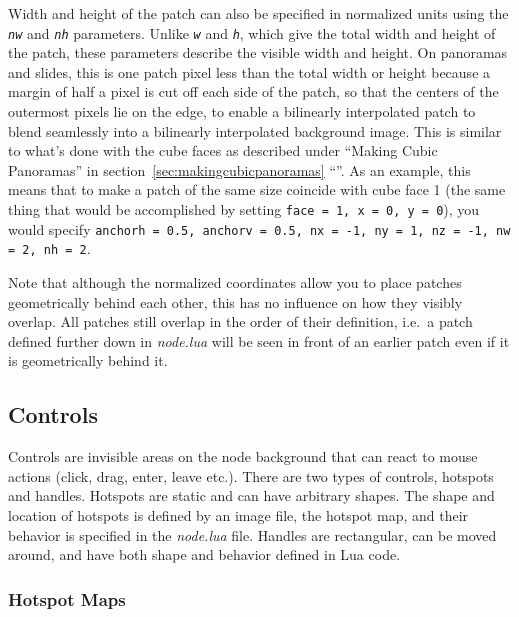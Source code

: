 \documentclass[
	a4paper,
	pagesize,
	10pt,
	oneside,
	idxtotoc,
	bibtotoc,
	BCOR10mm,
	DIV10
]{scrartcl} %
\newcommand{\luaparam}[1]{\texttt{\textit{#1}}}
\newcommand{\secref}[1]{\ref{sec:#1} “\nameref{sec:#1}”}
\begin{document}
Width and height of the patch can also be specified in normalized units using the \luaparam{nw} and \luaparam{nh} parameters. Unlike \luaparam{w} and \luaparam{h}, which give the total width and height of the patch, these parameters describe the visible width and height. On panoramas and slides, this is one patch pixel less than the total width or height because a margin of half a pixel is cut off each side of the patch, so that the centers of the outermost pixels lie on the edge, to enable a bilinearly interpolated patch to blend seamlessly into a bilinearly interpolated background image. This is similar to what's done with the cube faces as described under “Making Cubic Panoramas” in section~\secref{makingcubicpanoramas}. As an example, this means that to make a patch of the same size coincide with cube face 1 (the same thing that would be accomplished by setting \texttt{face = 1, x = 0, y = 0}), you would specify \texttt{anchorh = 0.5, anchorv = 0.5, nx = -1, ny = 1, nz = -1, nw = 2, nh = 2}.

Note that although the normalized coordinates allow you to place patches geometrically behind each other, this has no influence on how they visibly overlap. All patches still overlap in the order of their definition, i.e.\ a patch defined further down in \emph{node.lua} will be seen in front of an earlier patch even if it is geometrically behind it.

\subsection{Controls}

Controls are invisible areas on the node background that can react to mouse actions (click, drag, enter, leave etc.). There are two types of controls, hotspots and handles. Hotspots are static and can have arbitrary shapes. The shape and location of hotspots is defined by an image file, the hotspot map, and their behavior is specified in the \emph{node.lua} file. Handles are rectangular, can be moved around, and have both shape and behavior defined in Lua code.

\subsubsection{Hotspot Maps}
\end{document}

